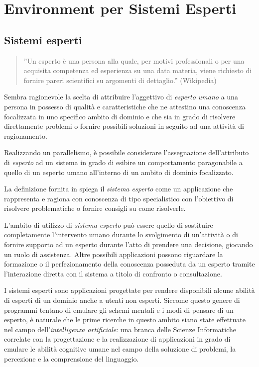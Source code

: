 \chapter{Environment per Sistemi Esperti}

\section{Sistemi esperti}
\begin{quote}
''Un esperto è una persona alla quale, per motivi professionali o per una acquisita competenza ed esperienza su una data materia, viene richiesto di fornire pareri scientifici su argomenti di dettaglio.'' (Wikipedia)
\end{quote}

Sembra ragionevole la scelta di attribuire l'aggettivo di \emph{esperto umano} a una persona in possesso di qualità e caratteristiche che ne attestino una conoscenza focalizzata in uno specifico ambito di dominio e che sia in grado di risolvere direttamente problemi o fornire possibili soluzioni in seguito ad una attività di ragionamento.

Realizzando un parallelismo, è possibile considerare l'assegnazione dell'attributo di \emph{esperto} ad un sistema in grado di esibire un comportamento paragonabile a quello di un esperto umano all'interno di un ambito di dominio focalizzato.

La definizione fornita in \cite{jackson1999} spiega il \emph{sistema esperto} come un applicazione che rappresenta e ragiona con conoscenza di tipo specialistico con l'obiettivo di risolvere problematiche o fornire consigli su come risolverle.

L'ambito di utilizzo di \emph{sistema esperto} può essere quello di sostituire completamente l'intervento umano durante lo svolgimento di un'attività o di fornire supporto ad un esperto durante l'atto di prendere una decisione, giocando un ruolo di assistenza. Altre possibili applicazioni possono riguardare la formazione o il perfezionamento della conoscenza posseduta da un esperto tramite l'interazione diretta con il sistema a titolo di confronto o consultazione.

I sistemi esperti sono applicazioni progettate per rendere disponibili alcune abilità di esperti di un dominio anche a utenti non esperti. Siccome questo genere di programmi tentano di emulare gli schemi mentali e i modi di pensare di un esperto, è naturale che le prime ricerche in questo ambito siano state effettuate nel campo dell'\emph{intelligenza artificiale}: una branca delle Scienze Informatiche correlate con la progettazione e la realizzazione di applicazioni in grado di emulare le abilità cognitive umane nel campo della soluzione di problemi, la percezione e la comprensione del linguaggio. \cite{feigenbaum1981ia}

